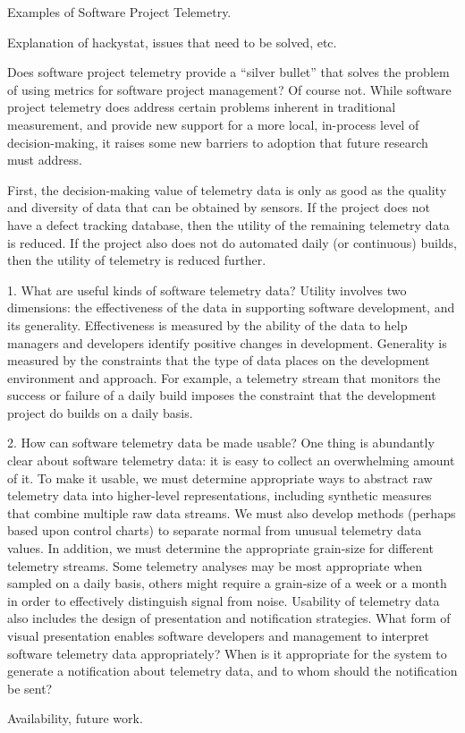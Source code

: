 \documentclass[11pt,twocolumn]{article}
\begin{document}

Examples of Software Project Telemetry.


Explanation of hackystat, issues that need to be solved, etc.


Does software project telemetry provide a ``silver bullet'' that solves the
problem of using metrics for software project management? Of course not.
While software project telemetry does address certain problems inherent in
traditional measurement, and provide new support for a more local,
in-process level of decision-making, it raises some new barriers to
adoption that future research must address.

First, the decision-making value of telemetry data is only as good as the
quality and diversity of data that can be obtained by sensors.  If the
project does not have a defect tracking database, then the utility of the
remaining telemetry data is reduced.  If the project also does not do
automated daily (or continuous) builds, then the utility of telemetry is
reduced further.   


   1. What are useful kinds of software telemetry data? Utility involves
   two dimensions: the effectiveness of the data in supporting software
   development, and its generality.  Effectiveness is measured by the
   ability of the data to help managers and developers identify positive
   changes in development. Generality is measured by the constraints that
   the type of data places on the development environment and approach. For
   example, a telemetry stream that monitors the success or failure of a
   daily build imposes the constraint that the development project do
   builds on a daily basis.
       
   2. How can software telemetry data be made usable? One thing is
   abundantly clear about software telemetry data: it is easy to collect an
   overwhelming amount of it.  To make it usable, we must determine
   appropriate ways to abstract raw telemetry data into higher-level
   representations, including synthetic measures that combine multiple raw
   data streams. We must also develop methods (perhaps based upon control
   charts) to separate normal from unusual telemetry data values. In
   addition, we must determine the appropriate grain-size for different
   telemetry streams.  Some telemetry analyses may be most appropriate when
   sampled on a daily basis, others might require a grain-size of a week or
   a month in order to effectively distinguish signal from noise. Usability
   of telemetry data also includes the design of presentation and
   notification strategies.  What form of visual presentation enables
   software developers and management to interpret software telemetry data
   appropriately?  When is it appropriate for the system to generate a
   notification about telemetry data, and to whom should the notification
   be sent?

Availability, future work.




\end{document}
